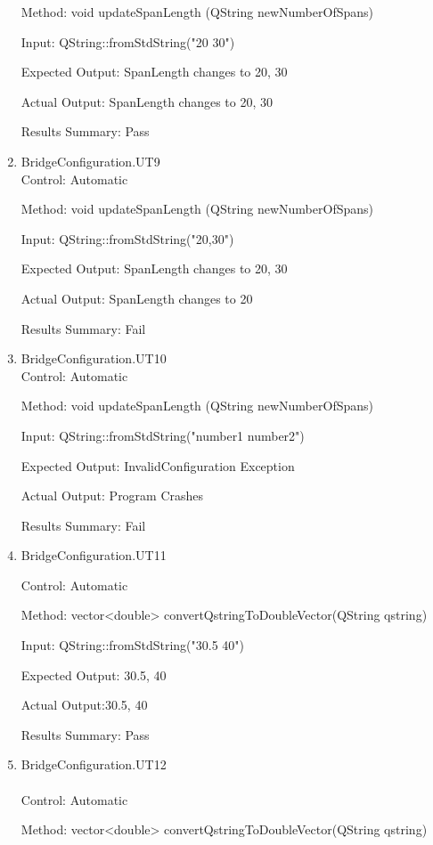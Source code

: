 \documentclass[12pt, titlepage]{article}
\begin{document}
\begin{enumerate}
    Method:  void updateSpanLength (QString newNumberOfSpans)
    
    Input: QString::fromStdString("20 30")
    
    Expected Output: SpanLength changes to {20, 30}

    Actual Output: SpanLength changes to {20, 30}

    Results Summary: Pass

    \item {BridgeConfiguration.UT9\\}
    Control: Automatic
    
    Method:  void updateSpanLength (QString newNumberOfSpans)
    
    Input: QString::fromStdString("20,30")
    
    Expected Output: SpanLength changes to {20, 30}

    Actual Output: SpanLength changes to {20}

    Results Summary: Fail

    \item {BridgeConfiguration.UT10\\}
    Control: Automatic
    
    Method:  void updateSpanLength (QString newNumberOfSpans)
    
    Input: QString::fromStdString("number1 number2")
    
    Expected Output: InvalidConfiguration Exception

    Actual Output: Program Crashes

    Results Summary: Fail

    \item {BridgeConfiguration.UT11\\}

    Control: Automatic
    
    Method:  vector<double> convertQstringToDoubleVector(QString qstring)
    
    Input: QString::fromStdString("30.5 40")
    
    Expected Output: {30.5, 40}

    Actual Output:{30.5, 40}

    Results Summary: Pass

    \item {BridgeConfiguration.UT12\\\\}
    Control: Automatic
    
    Method:  vector<double> convertQstringToDoubleVector(QString qstring)
    

\end{enumerate}
\end{document}
